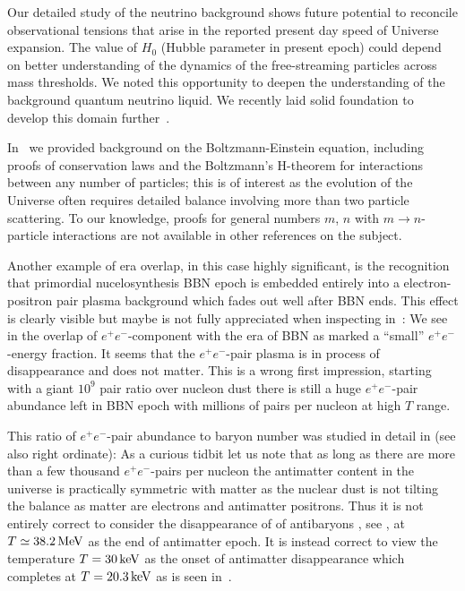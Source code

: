 Our detailed study of the neutrino background shows future potential to reconcile observational tensions that arise in the reported present day speed of Universe expansion. The value of $H_0$ (Hubble parameter in present epoch) could depend on better understanding of the dynamics of the free-streaming particles across mass thresholds. We noted this opportunity to deepen the understanding of the background quantum neutrino liquid. We recently laid solid foundation to develop this domain further~\cite{Birrell:2024bdb}.

In~ we provided background on the Boltzmann-Einstein equation, including proofs of conservation laws and the Boltzmann's H-theorem for interactions between any number of particles; this is of interest as the evolution of the Universe often requires detailed balance involving more than two particle scattering. To our knowledge, proofs for general numbers $m$, $n$ with $m\to n$-particle interactions are not available in other references on the subject.

Another example of era overlap, in this case highly significant, is the recognition that primordial nucelosynthesis BBN epoch is embedded entirely into a electron-positron pair plasma background which fades out well after BBN ends. This effect is clearly visible but maybe is not fully appreciated when inspecting in~: We see in the overlap of $e^+e^-$-component with the era of BBN as marked a ``small'' $e^+e^-$-energy fraction. It seems that the $e^+e^-$-pair plasma is in process of disappearance and does not matter. This is a wrong first impression,  starting with a giant $10^9$ pair ratio over nucleon dust there is still a huge $e^+e^-$-pair abundance left in BBN epoch with millions of pairs per nucleon at high $T$ range.

This ratio of $e^+e^-$-pair abundance to baryon number was studied  in detail in  (see also   right ordinate):  As a curious tidbit let us note that as long as there are more than a few thousand $e^+e^-$-pairs per nucleon the antimatter content in the universe is practically symmetric with matter as the nuclear dust is not tilting the balance as matter are electrons and antimatter positrons. Thus it is not entirely correct to consider the disappearance of of antibaryons , see , at $T\simeq 38.2\text{\,MeV}$ as the end of antimatter epoch. It is instead correct to view the temperature $T=30\text{\,keV}$ as the onset of antimatter disappearance which completes at $T=20.3\text{\,keV}$ as is seen in~.

